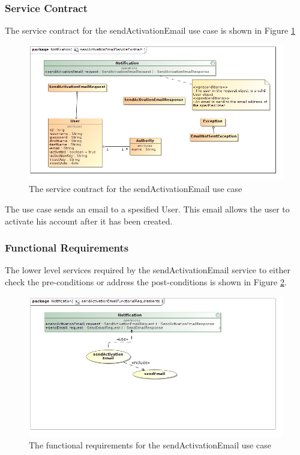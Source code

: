 \subsubsection{Service Contract}
The service contract for the sendActivationEmail use case is shown in Figure \ref{sendActivationEmailServiceContract}
\begin{figure}[H]
	\begin{center}
		\includegraphics[scale=0.5]{../Diagrams and Charts/Notifications/sendActivationEmailServiceContract.jpg}
		\caption{The service contract for the sendActivationEmail use case}
	\end{center}
	\label{sendActivationEmailServiceContract}
\end{figure}

The use case sends an email to a spesified User. This email allows the user to
activate his account after it has been created.

\subsubsection{Functional Requirements}
The lower level services required by the sendActivationEmail service to either check the
pre-conditions or address the post-conditions is shown in Figure
\ref{sendActivationEmailFunctionalRequirements}.
\begin{figure}[H]
	\begin{center}
		\includegraphics[scale=0.7]{../Diagrams and Charts/Notifications/sendActivationEmailFunctionalRequirements.jpg}
		\caption{The functional requirements for the sendActivationEmail use case}
	\end{center}
	\label{sendActivationEmailFunctionalRequirements}
\end{figure}

